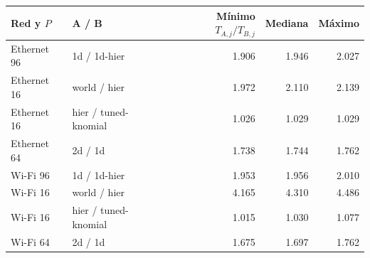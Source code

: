 \begin{center}\small
\begin{tabular}{llrrr}
\toprule
Red y $P$ & A / B & Mínimo $T_{A,j}/T_{B,j}$ & Mediana & Máximo \\
\midrule
Ethernet 96 & 1d / 1d-hier & 1.906 & 1.946 & 2.027 \\
Ethernet 16 & world / hier & 1.972 & 2.110 & 2.139 \\
Ethernet 16 & hier / tuned-knomial & 1.026 & 1.029 & 1.029 \\
Ethernet 64 & 2d / 1d & 1.738 & 1.744 & 1.762 \\
Wi-Fi 96 & 1d / 1d-hier & 1.953 & 1.956 & 2.010 \\
Wi-Fi 16 & world / hier & 4.165 & 4.310 & 4.486 \\
Wi-Fi 16 & hier / tuned-knomial & 1.015 & 1.030 & 1.077 \\
Wi-Fi 64 & 2d / 1d & 1.675 & 1.697 & 1.762 \\
\bottomrule
\end{tabular}
\end{center}
